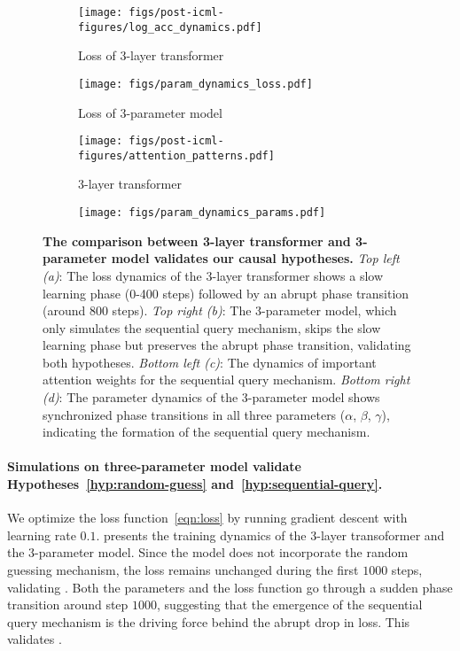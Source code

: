 \begin{figure}[h]
    \centering
    \begin{subfigure}[t]{0.23\textwidth}
        \caption{\small Loss of 3-layer transformer}
        \texttt{[image: figs/post-icml-figures/log\_acc\_dynamics.pdf]}
    \end{subfigure}
    \begin{subfigure}[t]{0.23\textwidth}
        \centering 
        \caption{\small Loss of 3-parameter model}
\texttt{[image: figs/param\_dynamics\_loss.pdf]}
    \end{subfigure}
    \begin{subfigure}[t]{0.23\textwidth}
        \caption{\small 3-layer transformer}
        \texttt{[image: figs/post-icml-figures/attention\_patterns.pdf]}
    \end{subfigure}
    \begin{subfigure}[t]{0.23\textwidth}
    \centering
\texttt{[image: figs/param\_dynamics\_params.pdf]}
    \end{subfigure}
    \caption{\textbf{The comparison between 3-layer transformer and 3-parameter model validates our causal hypotheses.} \textit{Top left (a)}: The loss dynamics of the 3-layer transformer shows a slow learning phase (0-400 steps) followed by an abrupt phase transition (around 800 steps). \textit{Top right (b)}: The 3-parameter model, which only simulates the sequential query mechanism, skips the slow learning phase but preserves the abrupt phase transition, validating both hypotheses. \textit{Bottom left (c)}: The dynamics of important attention weights for the sequential query mechanism. \textit{Bottom right (d)}: The parameter dynamics of the 3-parameter model shows synchronized phase transitions in all three parameters ($\alpha$, $\beta$, $\gamma$), indicating the formation of the sequential query mechanism.}

    \label{fig:3_param_dnamics}
\end{figure}


\paragraph{Simulations on three-parameter model validate Hypotheses~\ref{hyp:random-guess} and~\ref{hyp:sequential-query}.} We optimize the loss function~\cref{eqn:loss} by running gradient descent with learning rate $0.1$.  
 presents the training dynamics of the 3-layer transoformer and the 3-parameter model. Since the model does not incorporate the random guessing mechanism, the loss remains unchanged during the first $1000$ steps,  validating . 
Both the parameters and the loss function go through a sudden phase transition around step $1000$, suggesting that the emergence of the sequential query mechanism is the driving force behind the abrupt drop in loss. This validates . 

